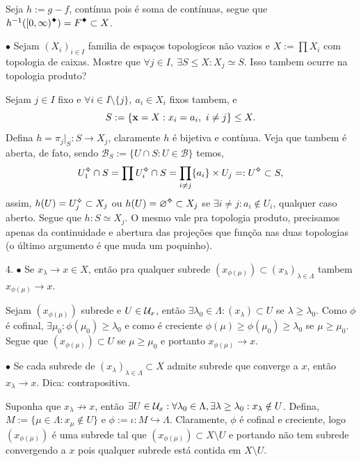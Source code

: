 \textcolor{gris}{Seja \(h:= g-f \), contínua pois é soma de contínuas, segue que \(h^{-1}([0, \infty)\ce)= F \ce \subset X \).  }  

\(\bullet \) Sejam \((X_i)_{i \in I}\) familia de espaços topologicos não vazios e \(X := \prod X_i\) com topologia de caixas. Mostre que \(\forall j \in I, \ \exists S \leq X : X_j \simeq S\). Isso tambem ocurre na topologia produto? 

\textcolor{gris}{Sejam \(j \in I\) fixo e \(\forall i \in I\setminus\{j\}, \ a_i \in X_i\) fixos tambem, e 
\[S := \{\textbf{x} = X : x_i = a_i, \ i \neq j\}\leq X. \]
Defina \(h = \pi_j |_S : S\to X_j\), claramente \(h \) é bijetiva e contínua. Veja que tambem é aberta, de fato, sendo \(\mathcal{B}_S := \{U \cap S : U\in \mathcal{B}\}\) temos, 
\[U_1\ab \cap S = \prod U_i\ab \cap S = \prod_{i\neq j} \{a_i\} \times U_j  =: U\ab \subset S,\]
assim, \(h(U) = U_j\ab \subset X_j\) ou \(h(U) = \varnothing\ab\subset X_j\) se \(\exists i\neq j : a_i \notin U_i\), qualquer caso aberto. Segue que \(h:S \simeq X_j\). O mesmo vale pra topologia produto, precisamos apenas da continuidade e abertura das projeções que funçõa nas duas topologias (o último argumento é que muda um poquinho). %
}  

4. \(\bullet \) Se \(x_\lambda \to x \in X\), então pra qualquer subrede \((x_{\phi(\mu)})\subset (x_\lambda)_{\lambda \in \Lambda}\) tambem \(x_{\phi(\mu)} \to x\). 

\textcolor{gris}{Sejam \((x_{\phi(\mu)})\) subrede e \(U \in \mathcal{U}_x\), então \(\exists \lambda_0 \in \Lambda : (x_\lambda) \subset U\) se \( \lambda \geq \lambda_0 \). Como \(\phi \) é cofinal, \(\exists \mu_0: \phi(\mu_0) \geq \lambda_0\) e como é creciente \(\phi(\mu) \geq \phi(\mu_0) \geq \lambda_0\) se \(\mu \geq \mu_0\). Segue que \((x_{\phi(\mu)}) \subset U\) se \(\mu \geq \mu_0\) e portanto  \(x_{\phi(\mu)} \to x\).   } 

\(\bullet\) Se cada subrede de \((x_\lambda)_{\lambda \in \Lambda} \subset X\) admite subrede que converge a \(x\), então \(x_\lambda \to x\). Dica: contrapositiva. 

\textcolor{gris}{Suponha que \(x_\lambda \not\to x \), então \(\exists U \in \mathcal{U}_x : \forall \lambda_0 \in \Lambda, \exists \lambda \geq \lambda_0 : x_\lambda \notin U\). Defina, \(M:= \{\mu \in \Lambda : x_\mu \notin U\}\) e \(\phi := \iota : M \hookrightarrow \Lambda\). Claramente, \(\phi \) é cofinal e creciente, logo \((x_{\phi(\mu)})\) é uma subrede tal que \((x_{\phi(\mu)})\subset X\setminus U\) e portando não tem subrede convergendo a \(x\) pois qualquer subrede está contida em \(X\setminus U\).   
}   

